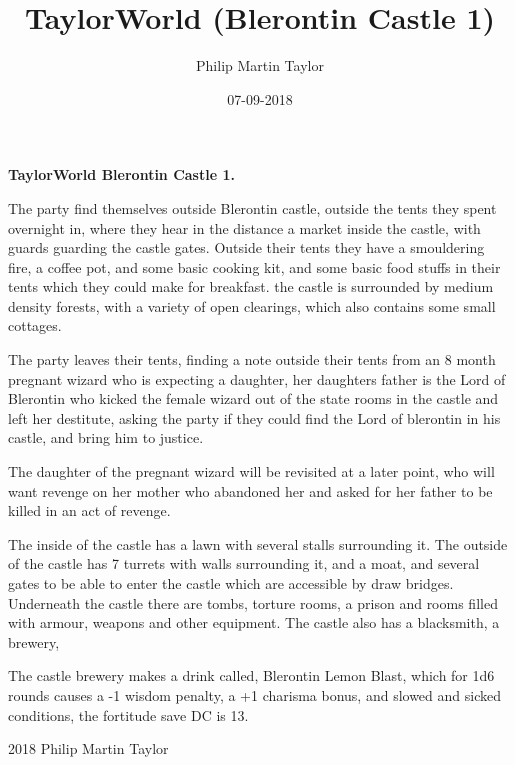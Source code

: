 \documentclass[12pt,a4paper]{book}
\date{07-09-2018}
\author{Philip Martin Taylor}
\title{TaylorWorld (Blerontin Castle 1)}
\begin{document}
\begin{center}
\textbf{TaylorWorld\texttrademark \: Blerontin Castle 1.}
\end{center}
\begin{flushleft}
  The party find themselves outside Blerontin castle, outside the tents they spent overnight in, where they hear in the distance a market inside the castle, with guards guarding the castle gates. Outside their tents they have a smouldering fire, a coffee pot, and some basic cooking kit, and some basic food stuffs in their tents which they could make for breakfast. the castle is surrounded by medium density forests, with a variety of open clearings, which also contains some small cottages.
\end{flushleft}
\begin{flushleft}
  The party leaves their tents, finding a note outside their tents from an 8 month pregnant wizard who is expecting a daughter, her daughters father is the Lord of Blerontin who kicked the female wizard out of the state rooms in the castle and left her destitute, asking the party if they could find the Lord of blerontin in his castle, and bring him to justice. 
\end{flushleft}
\begin{flushleft}
  The daughter of the pregnant wizard will be revisited at a later point, who will want revenge on her mother who abandoned her and asked for her father to be killed in an act of revenge.
\end{flushleft}
\begin{flushleft}
  The inside of the castle has a lawn with several stalls surrounding it. The outside of the castle has 7 turrets with walls surrounding it, and a moat, and several gates to be able to enter the castle which are accessible by draw bridges. Underneath the castle there are tombs, torture rooms, a prison and rooms filled with armour, weapons and other equipment. The castle also has a blacksmith, a brewery, 
\end{flushleft}
\begin{flushleft}
  The castle brewery makes a drink called, Blerontin Lemon Blast, which for 1d6 rounds causes a -1 wisdom penalty, a +1 charisma bonus, and slowed and sicked conditions, the fortitude save DC is 13.
\end{flushleft}
\begin{flushleft}
  
\end{flushleft}
\begin{center}
  \textcopyright{} 2018 Philip Martin Taylor
\end{center}
\end{document}
